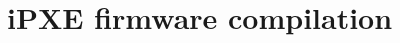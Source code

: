 \documentclass[../main.tex]{subfiles}
\begin{document}
\section{iPXE firmware compilation}
\end{document}
